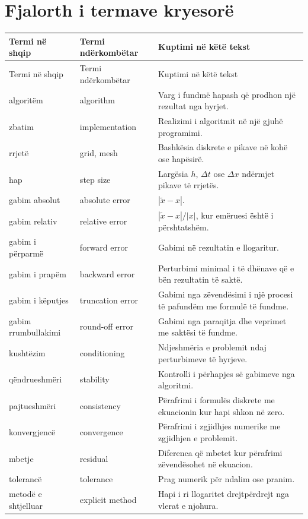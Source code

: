 \documentclass[11pt,oneside,openany]{book}
\begin{document}
\section{Fjalorth i termave kryesorë}
\small
\begin{longtable}{p{}p{}p{}}
\toprule
Termi në shqip & Termi ndërkombëtar & Kuptimi në këtë tekst\\ \midrule
\endfirsthead
\toprule
Termi në shqip & Termi ndërkombëtar & Kuptimi në këtë tekst\\ \midrule
\endhead
algoritëm & algorithm & Varg i fundmë hapash që prodhon një rezultat nga hyrjet.\\
zbatim & implementation & Realizimi i algoritmit në një gjuhë programimi.\\
rrjetë & grid, mesh & Bashkësia diskrete e pikave në kohë ose hapësirë.\\
hap & step size & Largësia $h$, $\Delta t$ ose $\Delta x$ ndërmjet pikave të rrjetës.\\
gabim absolut & absolute error & $|\tilde x-x|$.\\
gabim relativ & relative error & $|\tilde x-x|/|x|$, kur emëruesi është i përshtatshëm.\\
gabim i përparmë & forward error & Gabimi në rezultatin e llogaritur.\\
gabim i prapëm & backward error & Perturbimi minimal i të dhënave që e bën rezultatin të saktë.\\
gabim i këputjes & truncation error & Gabimi nga zëvendësimi i një procesi të pafundëm me formulë të fundme.\\
gabim rrumbullakimi & round-off error & Gabimi nga paraqitja dhe veprimet me saktësi të fundme.\\
kushtëzim & conditioning & Ndjeshmëria e problemit ndaj perturbimeve të hyrjeve.\\
qëndrueshmëri & stability & Kontrolli i përhapjes së gabimeve nga algoritmi.\\
pajtueshmëri & consistency & Përafrimi i formulës diskrete me ekuacionin kur hapi shkon në zero.\\
konvergjencë & convergence & Përafrimi i zgjidhjes numerike me zgjidhjen e problemit.\\
mbetje & residual & Diferenca që mbetet kur përafrimi zëvendësohet në ekuacion.\\
tolerancë & tolerance & Prag numerik për ndalim ose pranim.\\
metodë e shtjelluar & explicit method & Hapi i ri llogaritet drejtpërdrejt nga vlerat e njohura.\\

\end{longtable}
\end{document}
